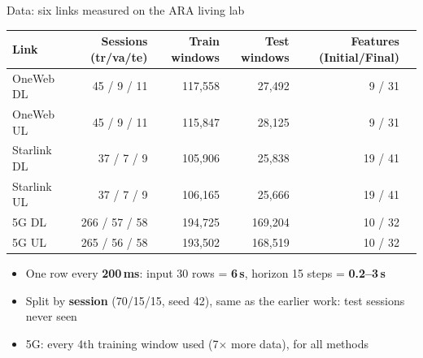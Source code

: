 \documentclass[aspectratio=169,11pt]{beamer}
\begin{document}
\begin{frame}{Data: six links measured on the ARA living lab}
  \centering\small
  \begin{tabular}{lrrrrr}
  \toprule
  Link & Sessions (tr/va/te) & Train windows & Test windows & Features (Initial/Final) \\
  \midrule
  OneWeb DL   & 45 / 9 / 11   & 117{,}558 & 27{,}492  & 9 / 31 \\
  OneWeb UL   & 45 / 9 / 11   & 115{,}847 & 28{,}125  & 9 / 31 \\
  Starlink DL & 37 / 7 / 9    & 105{,}906 & 25{,}838  & 19 / 41 \\
  Starlink UL & 37 / 7 / 9    & 106{,}165 & 25{,}666  & 19 / 41 \\
  5G DL       & 266 / 57 / 58 & 194{,}725 & 169{,}204 & 10 / 32 \\
  5G UL       & 265 / 56 / 58 & 193{,}502 & 168{,}519 & 10 / 32 \\
  \bottomrule
  \end{tabular}
  \vspace{0.3cm}
  \begin{itemize}
    \item One row every \textbf{200\,ms}: input 30 rows = \textbf{6\,s}, horizon 15 steps = \textbf{0.2--3\,s}
    \item Split by \textbf{session} (70/15/15, seed 42), same as the earlier work: test sessions never seen
    \item 5G: every 4th training window used (7$\times$ more data), for all methods
  \end{itemize}
\end{frame}
\end{document}
